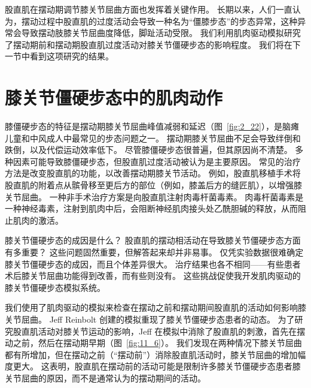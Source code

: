 股直肌在摆动期调节膝关节屈曲方面也发挥着关键作用。
长期以来，人们一直认为，摆动过程中股直肌的过度活动会导致一种名为“僵膝步态”的步态异常，这种异常会导致摆动肢膝关节屈曲度降低，脚趾活动受限。
我们利用肌肉驱动模拟研究了摆动期前和摆动期股直肌过度活动对膝关节僵硬步态的影响程度。
我们将在下一节中看到这项研究的结果。


\section{膝关节僵硬步态中的肌肉动作}

膝僵硬步态的特征是摆动期膝关节屈曲峰值减弱和延迟（图~\ref{fig:2_22}），是脑瘫儿童和中风成人中最常见的步态问题之一。
摆动期膝关节屈曲不足会导致绊倒和跌倒，以及代偿运动效率低下。
尽管膝僵硬步态很普遍，但其原因尚不清楚。
多种因素可能导致膝僵硬步态，但股直肌过度活动被认为是主要原因。
常见的治疗方法是改变股直肌的功能，以改善摆动期膝关节活动。
例如，股直肌移植手术将股直肌的附着点从髌骨移至更后方的部位（例如，膝盖后方的缝匠肌），以增强膝关节屈曲。
一种非手术治疗方案是向股直肌注射肉毒杆菌毒素。
肉毒杆菌毒素是一种神经毒素，注射到肌肉中后，会阻断神经肌肉接头处乙酰胆碱的释放，从而阻止肌肉的激活。


膝关节僵硬步态的成因是什么？
股直肌的摆动相活动在导致膝关节僵硬步态方面有多重要？
这些问题固然重要，但解答起来却并非易事。
仅凭实验数据很难确定膝关节僵硬步态的成因，而且个体差异很大。
治疗结果也各不相同——有些患者术后膝关节屈曲功能得到改善，而有些则没有。
这些挑战促使我开发肌肉驱动的膝关节僵硬步态模拟系统。


我们使用了肌肉驱动的模拟来检查在摆动之前和摆动期间股直肌的活动如何影响膝关节屈曲。
Jeff Reinbolt 创建的模拟重现了膝关节僵硬步态患者的动态。
为了研究股直肌活动对膝关节运动的影响，Jeff 在模拟中消除了股直肌的刺激，首先在摆动之前，然后在摆动期早期（图~\ref{fig:11_6}）。
我们发现在两种情况下膝关节屈曲都有所增加，但在摆动之前（“摆动前”）消除股直肌活动时，膝关节屈曲的增加幅度更大。
这表明，股直肌在摆动前的活动可能是限制许多膝关节僵硬步态患者膝关节屈曲的原因，而不是通常认为的摆动期间的活动。


